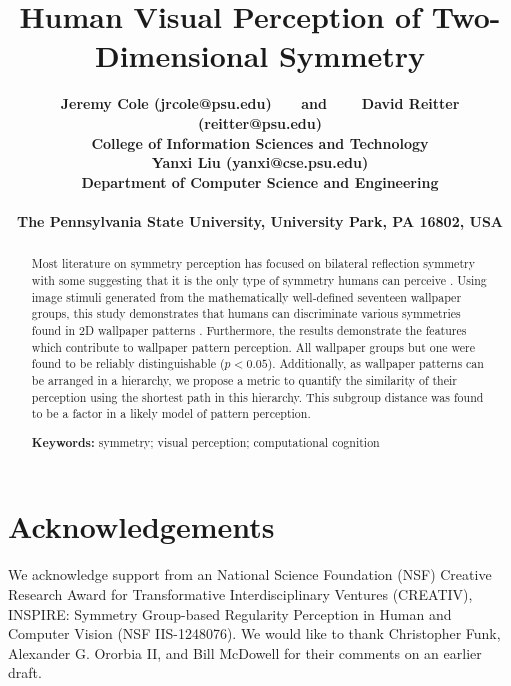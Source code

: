 \documentclass[10pt,letterpaper]{article}
\title{Human Visual Perception of Two-Dimensional Symmetry}
\author{\large \bf Jeremy Cole {(jrcole@psu.edu)}  ~~~\textnormal{and}
  ~~~ \large \bf David Reitter {(reitter@psu.edu)}  \\
College of Information Sciences and Technology \\
  \AND \large \bf Yanxi Liu {(yanxi@cse.psu.edu)} \\
  Department of Computer Science and Engineering \\
\\
The Pennsylvania State University, University Park, PA 16802, USA
}
\newcommand{\citep}[1]{\cite{#1}}
\begin{document}
\maketitle


\begin{abstract}
Most literature on symmetry perception has focused on bilateral reflection symmetry with some suggesting that it is the only type of symmetry humans can perceive \citep{bio}. Using image stimuli generated from the mathematically well-defined seventeen wallpaper groups, this study demonstrates that humans can discriminate various symmetries found in 2D wallpaper patterns \citep{yanxitrends}. Furthermore, the results demonstrate the features which contribute to wallpaper pattern perception. All wallpaper groups but one were found to be reliably distinguishable ($p<0.05$). Additionally, as wallpaper patterns can be arranged in a hierarchy, we propose a metric to quantify the similarity of their perception using the shortest path in this hierarchy. This subgroup distance was found to be a factor in a likely model of pattern perception. 

\textbf{Keywords:} 
symmetry; visual perception; computational cognition
\end{abstract}



%








\section*{Acknowledgements}

We acknowledge support from an
National Science Foundation (NSF) Creative Research Award for Transformative Interdisciplinary Ventures (CREATIV), INSPIRE:
Symmetry Group-based Regularity Perception in Human and Computer Vision (NSF IIS-1248076).  We would like to thank Christopher Funk, Alexander G. Ororbia II, and Bill McDowell for their comments on an earlier draft.




{
\renewcommand{\bibliographytypesize}{\small}
\setlength{\bibleftmargin}{.125in}
\setlength{\bibindent}{-\bibleftmargin}

}
\end{document}
